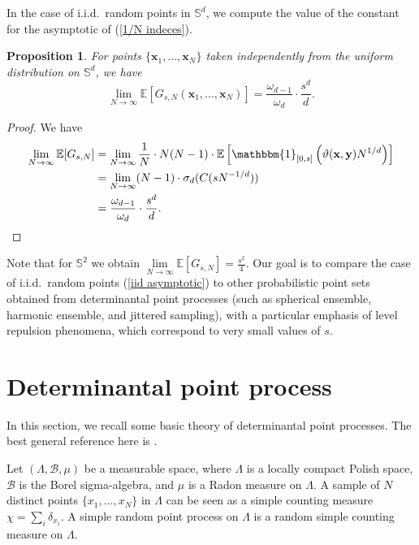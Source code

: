 \documentclass[a4paper,11pt]{amsart}
\newtheorem{prop}{Proposition}
\begin{document}
In the case of i.i.d.\ random points in $\mathbb{S}^d$, we compute the value of the constant for the asymptotic of (\ref{1/N indeces}).
\begin{prop}\label{iid proposition}
 For points $\{\mathbf{x}_1,\dots,\mathbf{x}_N\}$ taken independently from the uniform distribution on $\mathbb{S}^d$, we have 
\begin{equation}\label{iid asymptotic}
     \lim\limits_{N\rightarrow\infty}\mathbb{E}[G_{s,N}(\mathbf{x}_1,\dots,\mathbf{x}_N)]=\frac{\omega_{d-1}}{\omega_d}\cdot\frac{s^d}{d}.
\end{equation}
\end{prop}

\begin{proof}
We have
\begin{align*}    \lim\limits_{N\rightarrow\infty}\mathbb{E}[G_{s,N}]  &=\lim\limits_{N\rightarrow\infty}\frac{1}{N}\cdot N(N-1)\cdot \mathbb{E}\left[\mathbbm{1}_{[0,s]}\left(\vartheta(\mathbf{x},\mathbf{y})N^{1/d}\right)\right]
    \\  &=\lim\limits_{N\rightarrow\infty}(N-1)\cdot \sigma_d(C(sN^{-1/d}))
    \\ &=\frac{\omega_{d-1}}{\omega_d}\cdot\frac{s^d}{d}.
\end{align*}
\end{proof}

Note that for $\mathbb{S}^2$ we obtain $\lim\limits_{N\rightarrow\infty}\mathbb{E}[G_{s,N}] =\frac{s^2}{4}$. Our goal is to compare the case of i.i.d.\ random points (\ref{iid asymptotic}) to other probabilistic point sets obtained from determinantal point processes (such as spherical ensemble, harmonic ensemble, and jittered sampling), with a particular emphasis of level repulsion phenomena, which correspond to very small values of $s$.





\section{Determinantal point process}

 In this section, we recall some basic theory of determinantal point processes. The best general reference here is \cite{Hough2009-xh}.
 
 Let $(\Lambda,\mathcal{B}, \mu)$ be a measurable space, where $\Lambda$ is a locally compact Polish space, $\mathcal{B}$ is the Borel sigma-algebra, and $\mu$ is a Radon measure on $\Lambda$. A sample of $N$ distinct points $\{x_1,\dots,x_N\}$ in $\Lambda$ can be seen as a simple counting measure $\chi =\sum_i \delta_{x_i}$. A simple random point process on $\Lambda$ is a random simple counting measure on $\Lambda$.
\end{document}
